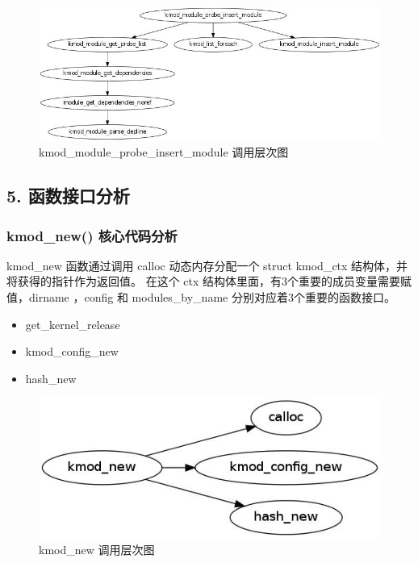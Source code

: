 \documentclass[11pt,a4paper]{article}
\makeatletter
\def\maxwidth{\ifdim\Gin@nat@width>\linewidth\linewidth
\else\Gin@nat@width\fi}
\let\Oldincludegraphics\includegraphics
\renewcommand{\includegraphics}[1]{\Oldincludegraphics[width=\maxwidth]{#1}}
\makeatother
\begin{document}
\begin{figure}[htbp]
\centering
\includegraphics{./figures/kmod_module_probe_insert_module.jpg}
\caption{kmod\_module\_probe\_insert\_module 调用层次图}
\end{figure}

\subsection{5. 函数接口分析}

\subsubsection{kmod\_new() 核心代码分析}

kmod\_new 函数通过调用 calloc 动态内存分配一个 struct kmod\_ctx
结构体，并将获得的指针作为返回值。 在这个 ctx
结构体里面，有3个重要的成员变量需要赋值，dirname ，config 和
modules\_by\_name 分别对应着3个重要的函数接口。

\begin{itemize}
\item
  get\_kernel\_release
\item
  kmod\_config\_new
\item
  hash\_new
\end{itemize}
\begin{figure}[htbp]
\centering
\includegraphics{./figures/kmod_new.jpg}
\caption{kmod\_new 调用层次图}
\end{figure}
\end{document}
